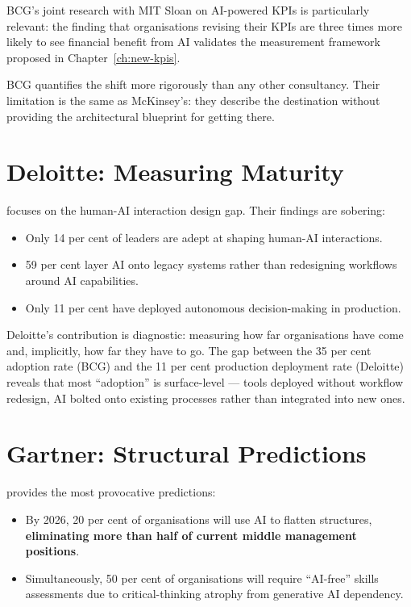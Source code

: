 BCG's joint research with MIT Sloan on AI-powered KPIs \parencite{BCGAIKPIs2025} is particularly relevant: the finding that organisations revising their KPIs are three times more likely to see financial benefit from AI validates the measurement framework proposed in Chapter~\ref{ch:new-kpis}.

BCG quantifies the shift more rigorously than any other consultancy. Their limitation is the same as McKinsey's: they describe the destination without providing the architectural blueprint for getting there.

\section{Deloitte: Measuring Maturity}

\textcite{Deloitte2026} focuses on the human-AI interaction design gap. Their findings are sobering:

\begin{itemize}
  \item Only 14 per cent of leaders are adept at shaping human-AI interactions.
  \item 59 per cent layer AI onto legacy systems rather than redesigning workflows around AI capabilities.
  \item Only 11 per cent have deployed autonomous decision-making in production.
\end{itemize}

Deloitte's contribution is diagnostic: measuring how far organisations have come and, implicitly, how far they have to go. The gap between the 35 per cent adoption rate (BCG) and the 11 per cent production deployment rate (Deloitte) reveals that most ``adoption'' is surface-level --- tools deployed without workflow redesign, AI bolted onto existing processes rather than integrated into new ones.

\section{Gartner: Structural Predictions}

\textcite{Gartner2025} provides the most provocative predictions:

\begin{itemize}
  \item By 2026, 20 per cent of organisations will use AI to flatten structures, \textbf{eliminating more than half of current middle management positions}.
  \item Simultaneously, 50 per cent of organisations will require ``AI-free'' skills assessments due to critical-thinking atrophy from generative AI dependency.
\end{itemize}

